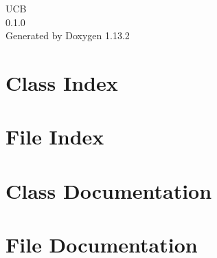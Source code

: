 \documentclass[twoside]{book}
\newcommand{\+}{\discretionary{\mbox{\scriptsize$\hookleftarrow$}}{}{}}
\newcommand{\clearemptydoublepage}{%
    \newpage{\pagestyle{empty}\cleardoublepage}%
  }
\begin{document}
  \raggedbottom
    \hypersetup{pageanchor=false,
                bookmarksnumbered=true,
                pdfencoding=unicode
               }
  \begin{titlepage}
  \vspace*{7cm}
  \begin{center}%
  {\Large UCB}\\
  [1ex]\large 0.\+1.\+0 \\
  \vspace*{1cm}
  {\large Generated by Doxygen 1.13.2}\\
  \end{center}
  \end{titlepage}
  \clearemptydoublepage
  \tableofcontents
  \clearemptydoublepage
  \hypersetup{pageanchor=true}



\chapter{Class Index}

\chapter{File Index}

\chapter{Class Documentation}








\chapter{File Documentation}













































\end{document}
